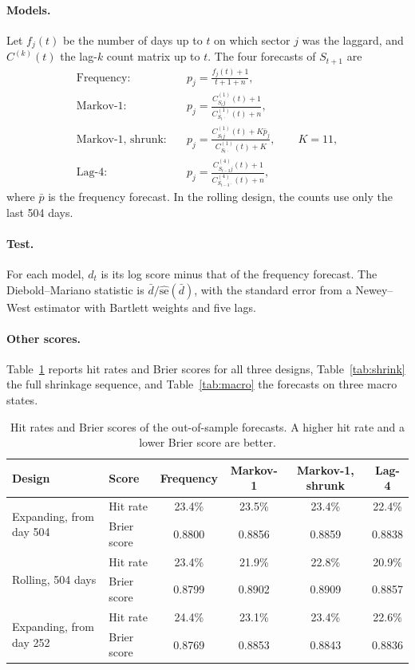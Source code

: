 \documentclass[11pt]{article}
\begin{document}
\paragraph{Models.} Let $f_j(t)$ be the number of days up to $t$ on which sector $j$ was the laggard, and $C^{(k)}(t)$ the lag-$k$ count matrix up to $t$. The four forecasts of $S_{t+1}$ are
\begin{align*}
\text{Frequency:}\quad & p_j = \frac{f_j(t) + 1}{t + 1 + n}, \\
\text{Markov-1:}\quad & p_j = \frac{C^{(1)}_{S_t j}(t) + 1}{C^{(1)}_{S_t \cdot}(t) + n}, \\
\text{Markov-1, shrunk:}\quad & p_j = \frac{C^{(1)}_{S_t j}(t) + K\bar p_j}{C^{(1)}_{S_t \cdot}(t) + K}, \qquad K = 11, \\
\text{Lag-4:}\quad & p_j = \frac{C^{(4)}_{S_{t-3} j}(t) + 1}{C^{(4)}_{S_{t-3} \cdot}(t) + n},
\end{align*}
where $\bar p$ is the frequency forecast. In the rolling design, the counts use only the last 504 days.

\paragraph{Test.} For each model, $d_t$ is its log score minus that of the frequency forecast. The Diebold--Mariano statistic is $\bar d/\widehat{\mathrm{se}}(\bar d)$, with the standard error from a Newey--West estimator with Bartlett weights and five lags.

\paragraph{Other scores.} Table~\ref{tab:hitbrier} reports hit rates and Brier scores for all three designs, Table~\ref{tab:shrink} the full shrinkage sequence, and Table~\ref{tab:macro} the forecasts on three macro states.

\begin{table}[htbp]\centering
\caption{Hit rates and Brier scores of the out-of-sample forecasts. A higher hit rate and a lower Brier score are better.}
\label{tab:hitbrier}
\small
\begin{tabular}{llcccc}
\toprule
Design & Score & Frequency & Markov-1 & Markov-1, shrunk & Lag-4 \\
\midrule
\multirow{2}{*}{Expanding, from day 504} & Hit rate & 23.4\% & 23.5\% & 23.4\% & 22.4\% \\
 & Brier score & 0.8800 & 0.8856 & 0.8859 & 0.8838 \\
\multirow{2}{*}{Rolling, 504 days} & Hit rate & 23.4\% & 21.9\% & 22.8\% & 20.9\% \\
 & Brier score & 0.8799 & 0.8902 & 0.8909 & 0.8857 \\
\multirow{2}{*}{Expanding, from day 252} & Hit rate & 24.4\% & 23.1\% & 23.4\% & 22.6\% \\
 & Brier score & 0.8769 & 0.8853 & 0.8843 & 0.8836 \\
\bottomrule
\end{tabular}
\end{table}
\end{document}
